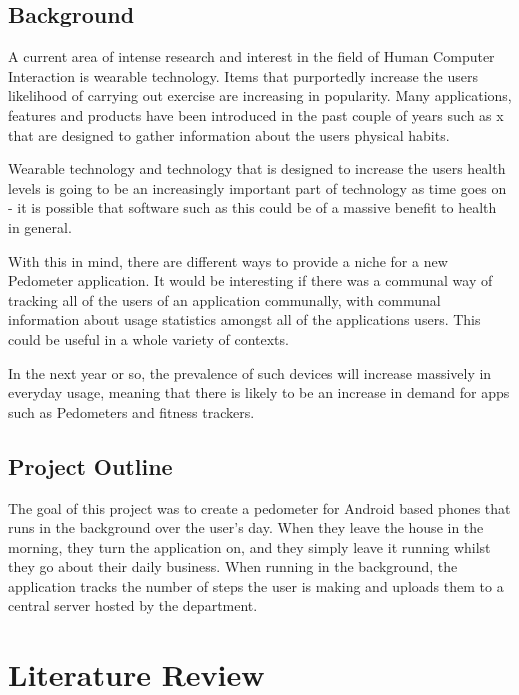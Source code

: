 \documentclass{l4proj}
\begin{document}
\section{Background}

A current area of intense research and interest in the field of Human Computer Interaction is wearable technology. Items that purportedly increase the users likelihood of carrying out exercise are increasing in popularity. Many applications, features and products have been introduced in the past couple of years such as x that are designed to gather information about the users physical habits. 

Wearable technology and technology that is designed to increase the users health levels is going to be an increasingly important part of technology as time goes on - it is possible that software such as this could be of a massive benefit to health in general.

With this in mind, there are different ways to provide a niche for a new Pedometer application. It would be interesting if there was a communal way of tracking all of the users of an application communally, with communal information about usage statistics amongst all of the applications users. This could be useful in a whole variety of contexts.

In the next year or so, the prevalence of such devices will increase massively in everyday usage, meaning that there is likely to be an increase in demand for apps such as Pedometers and fitness trackers. 

\section{Project Outline}

The goal of this project was to create a pedometer for Android based phones that runs in the background over the user's day. When they leave the house in the morning, they turn the application on, and they simply leave it running whilst they go about their daily business. When running in the background, the application tracks the number of steps the user is making and uploads them to a central server hosted by the department. 


\chapter{Literature Review}
\end{document}
